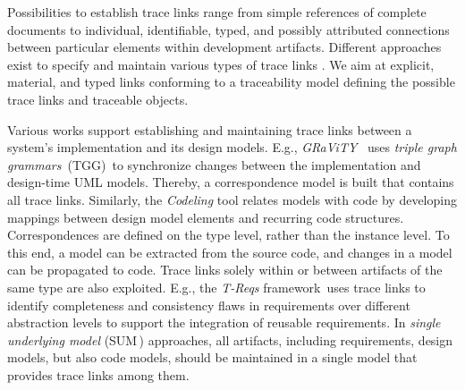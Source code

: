 Possibilities to establish trace links range from simple references of complete documents to individual, identifiable, typed, and possibly attributed connections between particular elements within development artifacts. %
Different approaches exist to specify and maintain \cite{winkler2010survey} various types of trace links %
\cite{spanoudakis2005software,Espinoza2006ASC}.
We aim at explicit, material, and typed links conforming to a traceability model \cite{Pinheiro2004trace,schwarz2010gbt,Grosser2022RDR} defining the possible trace links and traceable objects.

Various works support establishing and maintaining trace links between a system's implementation and its design models.
E.g., %
\emph{GRaViTY}%
\,\cite{PKLS2015,PBKJ2021,Peldszus2022} %
uses
\emph{triple graph grammars}~(TGG)\,\cite{schurr1994specification} to synchronize changes between the implementation and design-time UML models.
Thereby, a correspondence model is built that contains all trace links.
Similarly, the \emph{Codeling} tool \cite{Konersmann2018OEM, Konersmann2018EIA} relates models with code by developing mappings between design model elements and recurring code structures.
Correspondences are defined on the type level, rather than the instance level.
To this end, a model can be extracted from the source code, and changes in a model can be propagated to code.
Trace links solely within or between artifacts of the same type are also exploited.
E.g., the \emph{T-Reqs} framework\,\cite{Grosser2022RDR} uses trace links
to identify completeness and consistency flaws in requirements over different abstraction levels to support the integration of reusable requirements.
In \emph{single underlying model} (SUM\,\cite{Meier2020,Atkinson2010}) approaches, all artifacts, including requirements, design models, but also code models, should be maintained in a single model that provides trace links among them.

